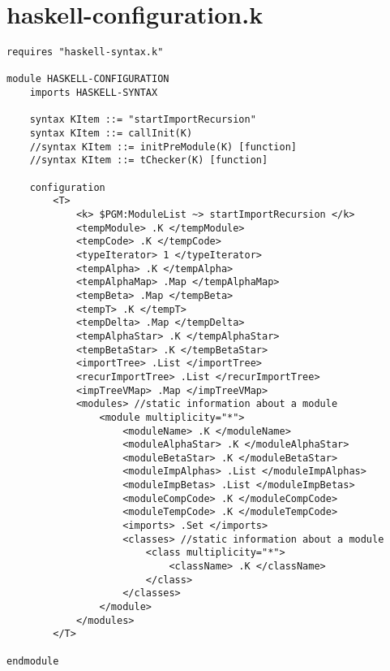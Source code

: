 \chapter{haskell-configuration.k}
\begin{lstlisting}
requires "haskell-syntax.k"

module HASKELL-CONFIGURATION
    imports HASKELL-SYNTAX

    syntax KItem ::= "startImportRecursion"
    syntax KItem ::= callInit(K)
    //syntax KItem ::= initPreModule(K) [function]
    //syntax KItem ::= tChecker(K) [function]

    configuration 
        <T>
            <k> $PGM:ModuleList ~> startImportRecursion </k>
            <tempModule> .K </tempModule>
            <tempCode> .K </tempCode>
            <typeIterator> 1 </typeIterator>
            <tempAlpha> .K </tempAlpha>
            <tempAlphaMap> .Map </tempAlphaMap>
            <tempBeta> .Map </tempBeta>
            <tempT> .K </tempT>
            <tempDelta> .Map </tempDelta>
            <tempAlphaStar> .K </tempAlphaStar>
            <tempBetaStar> .K </tempBetaStar>
            <importTree> .List </importTree>
            <recurImportTree> .List </recurImportTree>
            <impTreeVMap> .Map </impTreeVMap>
            <modules> //static information about a module
                <module multiplicity="*">
                    <moduleName> .K </moduleName>
                    <moduleAlphaStar> .K </moduleAlphaStar>
                    <moduleBetaStar> .K </moduleBetaStar>
                    <moduleImpAlphas> .List </moduleImpAlphas>
                    <moduleImpBetas> .List </moduleImpBetas>
                    <moduleCompCode> .K </moduleCompCode>
                    <moduleTempCode> .K </moduleTempCode>
                    <imports> .Set </imports>
                    <classes> //static information about a module
                        <class multiplicity="*">
                            <className> .K </className>
                        </class>
                    </classes>
                </module>
            </modules>
        </T>

endmodule
\end{lstlisting}

